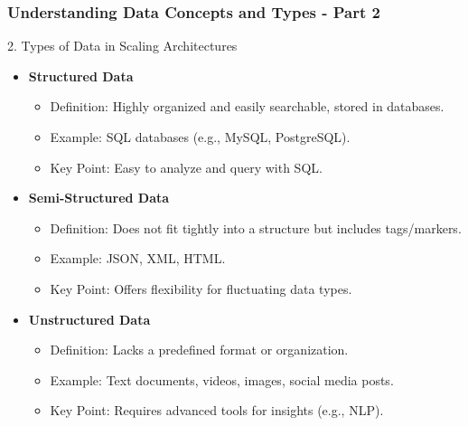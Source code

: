 \documentclass{beamer}
\begin{document}
\begin{frame}[fragile]
    \frametitle{Understanding Data Concepts and Types - Part 2}
    
    \begin{block}{2. Types of Data in Scaling Architectures}
        \begin{itemize}
            \item \textbf{Structured Data}
                \begin{itemize}
                    \item Definition: Highly organized and easily searchable, stored in databases.
                    \item Example: SQL databases (e.g., MySQL, PostgreSQL).
                    \item Key Point: Easy to analyze and query with SQL.
                \end{itemize}
                
            \item \textbf{Semi-Structured Data}
                \begin{itemize}
                    \item Definition: Does not fit tightly into a structure but includes tags/markers.
                    \item Example: JSON, XML, HTML.
                    \item Key Point: Offers flexibility for fluctuating data types.
                \end{itemize}
                
            \item \textbf{Unstructured Data}
                \begin{itemize}
                    \item Definition: Lacks a predefined format or organization.
                    \item Example: Text documents, videos, images, social media posts.
                    \item Key Point: Requires advanced tools for insights (e.g., NLP).
                \end{itemize}
        \end{itemize}
    \end{block}
\end{frame}
\end{document}
